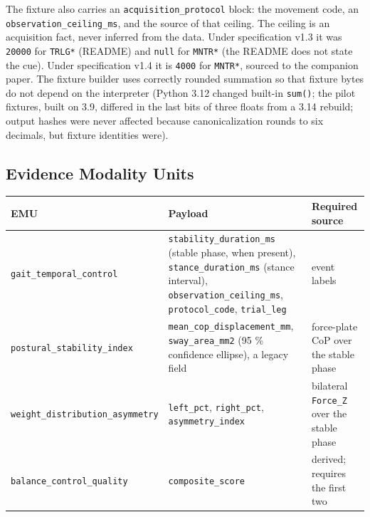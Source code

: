 \documentclass[11pt]{article}
\begin{document}
The fixture also carries an \texttt{acquisition\_protocol} block: the movement code, an \texttt{observation\_ceiling\_ms}, and the source of that ceiling. The ceiling is an acquisition fact, never inferred from the data. Under specification v1.3 it was \texttt{20000} for \texttt{TRLG*} (README) and \texttt{null} for \texttt{MNTR*} (the README does not state the cue). Under specification v1.4 it is \texttt{4000} for \texttt{MNTR*}, sourced to the companion paper. The fixture builder uses correctly rounded summation so that fixture bytes do not depend on the interpreter (Python 3.12 changed built-in \texttt{sum()}; the pilot fixtures, built on 3.9, differed in the last bits of three floats from a 3.14 rebuild; output hashes were never affected because canonicalization rounds to six decimals, but fixture identities were).

\subsection{Evidence Modality Units}\label{evidence-modality-units}

\begin{longtable}[]{@{}
  >{\raggedright\arraybackslash}p{}
  >{\raggedright\arraybackslash}p{}
  >{\raggedright\arraybackslash}p{}@{}}
\toprule\noalign{}
\begin{minipage}[b]{\linewidth}\raggedright
EMU
\end{minipage} & \begin{minipage}[b]{\linewidth}\raggedright
Payload
\end{minipage} & \begin{minipage}[b]{\linewidth}\raggedright
Required source
\end{minipage} \\
\midrule\noalign{}
\endhead
\bottomrule\noalign{}
\endlastfoot
\texttt{gait\_temporal\_control} & \texttt{stability\_duration\_ms} (stable phase, when present), \texttt{stance\_duration\_ms} (stance interval), \texttt{observation\_ceiling\_ms}, \texttt{protocol\_code}, \texttt{trial\_leg} & event labels \\
\texttt{postural\_stability\_index} & \texttt{mean\_cop\_displacement\_mm}, \texttt{sway\_area\_mm2} (95 \% confidence ellipse), a legacy field & force-plate CoP over the stable phase \\
\texttt{weight\_distribution\_asymmetry} & \texttt{left\_pct}, \texttt{right\_pct}, \texttt{asymmetry\_index} & bilateral \texttt{Force\_Z} over the stable phase \\
\texttt{balance\_control\_quality} & \texttt{composite\_score} & derived; requires the first two \\
\end{longtable}
\end{document}

